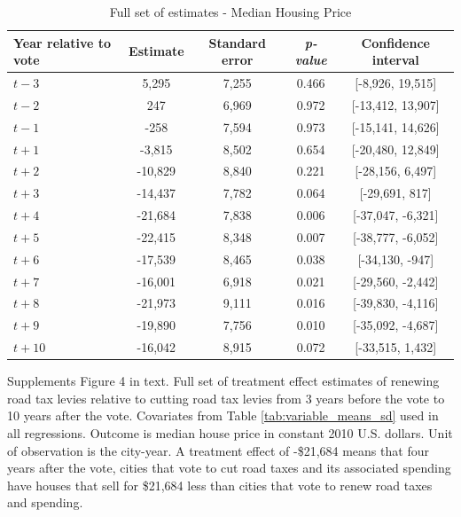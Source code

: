 \begin{table}[htbp]
    \centering
    \caption{Full set of estimates - Median Housing Price}
    \label{tab:median_sale_amount_full}
    \begin{tabular}{p{3cm}cccc}
        \hline
        \textbf{Year relative to vote} & \textbf{Estimate} & \textbf{Standard error} & \textbf{\textit{p-value}} & \textbf{Confidence interval} \\
        \hline
        $t - 3$  & 5,295   & 7,255  & 0.466  & [-8,926, 19,515] \\
        $t - 2$  & 247     & 6,969  & 0.972  & [-13,412, 13,907] \\
        $t - 1$  & -258    & 7,594  & 0.973  & [-15,141, 14,626] \\
        $t + 1$  & -3,815  & 8,502  & 0.654  & [-20,480, 12,849] \\
        $t + 2$  & -10,829 & 8,840  & 0.221  & [-28,156, 6,497] \\
        $t + 3$  & -14,437 & 7,782  & 0.064  & [-29,691, 817] \\
        $t + 4$  & -21,684 & 7,838  & 0.006  & [-37,047, -6,321] \\
        $t + 5$  & -22,415 & 8,348  & 0.007  & [-38,777, -6,052] \\
        $t + 6$  & -17,539 & 8,465  & 0.038  & [-34,130, -947] \\
        $t + 7$  & -16,001 & 6,918  & 0.021  & [-29,560, -2,442] \\
        $t + 8$  & -21,973 & 9,111  & 0.016  & [-39,830, -4,116] \\
        $t + 9$  & -19,890 & 7,756  & 0.010  & [-35,092, -4,687] \\
        $t + 10$ & -16,042 & 8,915  & 0.072  & [-33,515, 1,432] \\
        \hline
    \end{tabular} 
    \begin{tablenotes}
        \small
        \item Supplements Figure 4 in text. Full set of treatment effect estimates of renewing road tax levies relative to cutting road tax levies from 3 years before the vote to 10 years after the vote. Covariates from Table \ref{tab:variable_means_sd} used in all regressions. Outcome is median house price in constant 2010 U.S. dollars. Unit of observation is the city-year. A treatment effect of -\$21,684 means that four years after the vote, cities that vote to cut road taxes and its associated spending have houses that sell for \$21,684 less than cities that vote to renew road taxes and spending.
    \end{tablenotes}
\end{table}

